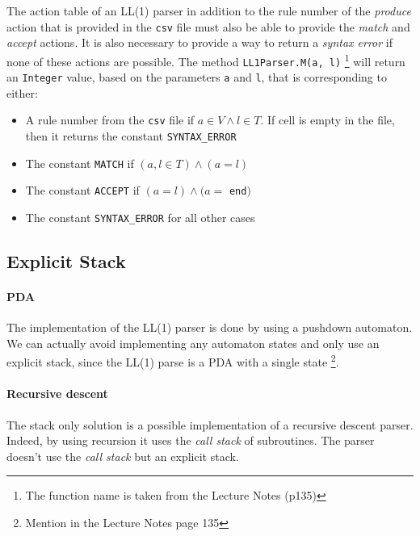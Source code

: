 \documentclass[letterpaper]{article}
\begin{document}
The action table of an LL(1) parser in addition to the rule number of the
\textit{produce} action that is provided in the \texttt{csv} file must
also be able to provide the \textit{match} and \textit{accept} actions. It
is also necessary to provide a way to return a \textit{syntax error}
if none of these actions are possible. The method \texttt{LL1Parser.M(a, l)}
\footnote{The function name is taken from the Lecture Notes (p135)}
will return an \texttt{Integer} value, based on the parameters \texttt{a} and
\texttt{l},
 that is corresponding to either:
\begin{itemize}
    \item A rule number from the \texttt{csv} file if $a \in V \wedge l \in T$.
    If cell is empty in the file, then it returns the constant
    \texttt{SYNTAX\_ERROR}
    \item The constant \texttt{MATCH} if $(a, l \in T) \wedge (a = l)$
    \item The constant \texttt{ACCEPT} if $(a = l) \wedge (a =$ \texttt{end}$)$
    \item The constant \texttt{SYNTAX\_ERROR} for all other cases
\end{itemize}

\label{implactiontable}

\subsection{Explicit Stack}

\label{implstack}

\paragraph{PDA}


The implementation of the LL(1) parser is done by using a pushdown automaton.
We can actually avoid implementing any automaton states and only use
an explicit stack, since the LL(1) parse is a PDA with a single state
\footnote{Mention in the Lecture Notes page 135}.

\paragraph{Recursive descent}

The stack only
solution is a possible implementation of a recursive descent parser. Indeed,
by using recursion it uses the \textit{call stack} of subroutines.
The parser doesn't use the \textit{call stack} but
an explicit stack.
\end{document}
